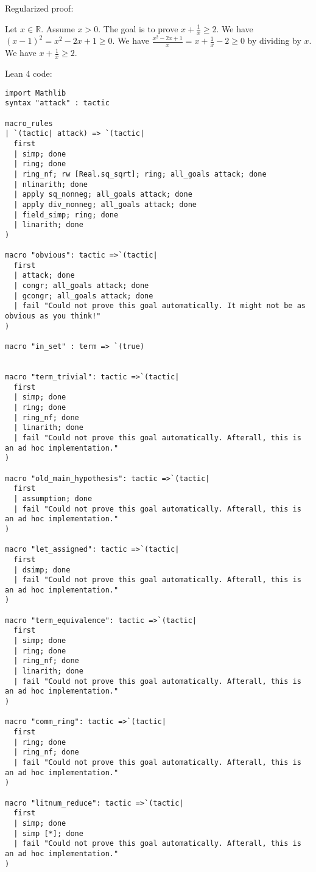 \documentclass{article}
\begin{document}
Regularized proof:
\begin{tcolorbox}[colback=red!10, width=\linewidth]
Let $x\in\mathbb{R}$. Assume $x>0$.
The goal is to prove $x + \frac{1}{x} \ge 2$.
We have ${\left(x-1\right)}^2 = x^2 - 2x + 1 \ge 0$.
We have $\frac{x^2 - 2x + 1}{x} = x + \frac{1}{x} - 2 \ge 0$ by dividing by $x$.
We have $x + \frac{1}{x} \ge 2$.
\end{tcolorbox}

Lean 4 code:
\begin{tcolorbox}[colback=white!10, width=\linewidth]
\begin{lstlisting}[language=Lean4]
import Mathlib
syntax "attack" : tactic

macro_rules
| `(tactic| attack) => `(tactic|
  first
  | simp; done
  | ring; done
  | ring_nf; rw [Real.sq_sqrt]; ring; all_goals attack; done
  | nlinarith; done
  | apply sq_nonneg; all_goals attack; done
  | apply div_nonneg; all_goals attack; done
  | field_simp; ring; done
  | linarith; done
)

macro "obvious": tactic =>`(tactic|
  first
  | attack; done
  | congr; all_goals attack; done
  | gcongr; all_goals attack; done
  | fail "Could not prove this goal automatically. It might not be as obvious as you think!"
)

macro "in_set" : term => `(true)


macro "term_trivial": tactic =>`(tactic|
  first
  | simp; done
  | ring; done
  | ring_nf; done
  | linarith; done
  | fail "Could not prove this goal automatically. Afterall, this is an ad hoc implementation."
)

macro "old_main_hypothesis": tactic =>`(tactic|
  first
  | assumption; done
  | fail "Could not prove this goal automatically. Afterall, this is an ad hoc implementation."
)

macro "let_assigned": tactic =>`(tactic|
  first
  | dsimp; done
  | fail "Could not prove this goal automatically. Afterall, this is an ad hoc implementation."
)

macro "term_equivalence": tactic =>`(tactic|
  first
  | simp; done
  | ring; done
  | ring_nf; done
  | linarith; done
  | fail "Could not prove this goal automatically. Afterall, this is an ad hoc implementation."
)

macro "comm_ring": tactic =>`(tactic|
  first
  | ring; done
  | ring_nf; done
  | fail "Could not prove this goal automatically. Afterall, this is an ad hoc implementation."
)

macro "litnum_reduce": tactic =>`(tactic|
  first
  | simp; done
  | simp [*]; done
  | fail "Could not prove this goal automatically. Afterall, this is an ad hoc implementation."
)


\end{lstlisting}
\end{tcolorbox}
\end{document}
